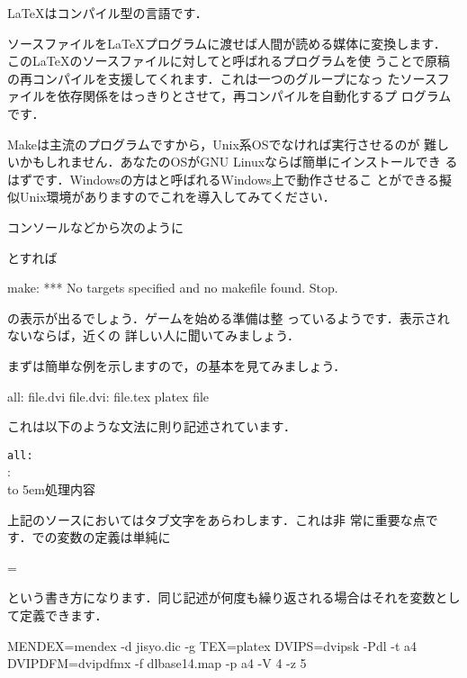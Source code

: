 
\newcommand*\MakeTabSkip{\hbox to 5em{\rightarrowfill}}

{\LaTeX}は{コンパイル型}の言語です．

ソースファイルを{\LaTeX}プログラムに渡せば人間が読める媒体に変換します．
この{\LaTeX}のソースファイルに対してと呼ばれるプログラムを使
うことで原稿の再コンパイルを支援してくれます．これは一つのグループになっ
たソースファイルを依存関係をはっきりとさせて，再コンパイルを自動化するプ
ログラムです．

Makeは\unixos 主流のプログラムですから，Unix系OSでなければ実行させるのが
難しいかもしれません．あなたのOSがGNU Linuxならば簡単にインストールでき
るはずです．Windowsの方はと呼ばれるWindows上で動作させるこ
とができる擬似Unix環境がありますのでこれを導入してみてください．

コンソールなどから次のように
\begin{InTerm}
\end{InTerm}
とすれば
\begin{OutTerm}
make: *** No targets specified and no makefile found.  Stop.
\end{OutTerm}
の表示が出るでしょう．ゲームを始める準備は整
っているようです．表示されないならば，近くの
詳しい人に聞いてみましょう．

まずは簡単な例を示しますので，の基本を見てみましょう．
\begin{Makefile}
all: file.dvi
file.dvi: file.tex
	platex file
\end{Makefile}
これは以下のような文法に則り記述されています．
\begin{Syntax}
\verb|all:| \\
: \\
\MakeTabSkip 処理内容
\end{Syntax}
上記のソースにおいて\qu{\MakeTabSkip}はタブ文字をあらわします．これは非
常に重要な点です．での変数の定義は単純に
\begin{Syntax}
\str=
\end{Syntax}
という書き方になります．同じ記述が何度も繰り返される場合はそれを変数とし
て定義できます．
\begin{Makefile}
MENDEX=mendex -d jisyo.dic -g
TEX=platex 
DVIPS=dvipsk -Pdl -t a4
DVIPDFM=dvipdfmx -f dlbase14.map -p a4 -V 4 -z 5
\end{Makefile}

